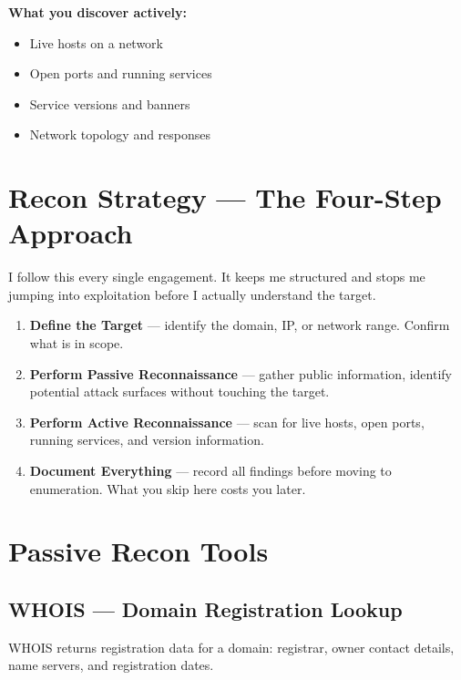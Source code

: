 \textbf{What you discover actively:}
\begin{itemize}
  \item Live hosts on a network
  \item Open ports and running services
  \item Service versions and banners
  \item Network topology and responses
\end{itemize}

\section{Recon Strategy --- The Four-Step Approach}
\label{sec:recon_strategy}

I follow this every single engagement. It keeps me structured and stops me
jumping into exploitation before I actually understand the target.

\begin{enumerate}
  \item \textbf{Define the Target} --- identify the domain, IP, or network range.
        Confirm what is in scope.
  \item \textbf{Perform Passive Reconnaissance} --- gather public information,
        identify potential attack surfaces without touching the target.
  \item \textbf{Perform Active Reconnaissance} --- scan for live hosts, open ports,
        running services, and version information.
  \item \textbf{Document Everything} --- record all findings before moving to
        enumeration. What you skip here costs you later.
\end{enumerate}

\section{Passive Recon Tools}
\label{sec:passive_tools}

\subsection{WHOIS --- Domain Registration Lookup}

WHOIS returns registration data for a domain: registrar, owner contact details,
name servers, and registration dates.

